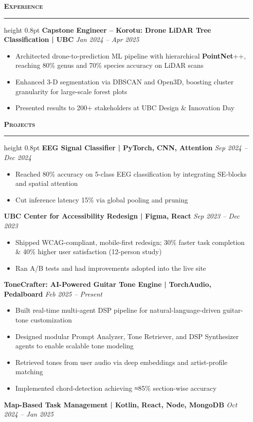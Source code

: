 \documentclass[11pt, letterpaper]{article}
\newcommand{\resumesection}[1]{
  \vspace{8pt} %
  {\large\bfseries\scshape\color{black}#1} %
  \vspace{3pt} %
  \hrule height 0.8pt %
  \vspace{8pt} %
}
\begin{document}
\resumesection{Experience}%
  \textbf{ Capstone Engineer – Korotu: Drone LiDAR Tree Classification | UBC } \hfill \textit{ Jan 2024 -- Apr 2025 }
  \vspace{1pt} %
  \begin{itemize}\item Architected drone-to-prediction ML pipeline with hierarchical \textbf{PointNet}++, reaching 80\% genus and 70\% species accuracy on LiDAR scans\item Enhanced 3-D segmentation via DBSCAN and Open3D, boosting cluster granularity for large-scale forest plots\item Presented results to 200+ stakeholders at UBC Design \& Innovation Day\end{itemize}
\resumesection{Projects}\textbf{ EEG Signal Classifier | PyTorch, CNN, Attention } \hfill \textit{ Sep 2024 -- Dec 2024 }
  \vspace{1pt}
  \begin{itemize}\item Reached 80\% accuracy on 5-class EEG classification by integrating SE-blocks and spatial attention\item Cut inference latency 15\% via global pooling and pruning\end{itemize}\textbf{ UBC Center for Accessibility Redesign | Figma, React } \hfill \textit{ Sep 2023 -- Dec 2023 }
  \vspace{1pt}
  \begin{itemize}\item Shipped WCAG-compliant, mobile-first redesign; 30\% faster task completion \& 40\% higher user satisfaction (12-person study)\item Ran A/B tests and had improvements adopted into the live site\end{itemize}\textbf{ ToneCrafter: AI-Powered Guitar Tone Engine | TorchAudio, Pedalboard } \hfill \textit{ Feb 2025 -- Present }
  \vspace{1pt}
  \begin{itemize}\item Built real-time multi-agent DSP pipeline for natural-language-driven guitar-tone customization\item Designed modular Prompt Analyzer, Tone Retriever, and DSP Synthesizer agents to enable scalable tone modeling\item Retrieved tones from user audio via deep embeddings and artist-profile matching\item Implemented chord-detection achieving ≈85\% section-wise accuracy\end{itemize}\textbf{ Map-Based Task Management | Kotlin, React, Node, MongoDB } \hfill \textit{ Oct 2024 -- Jan 2025 }
\end{document}
